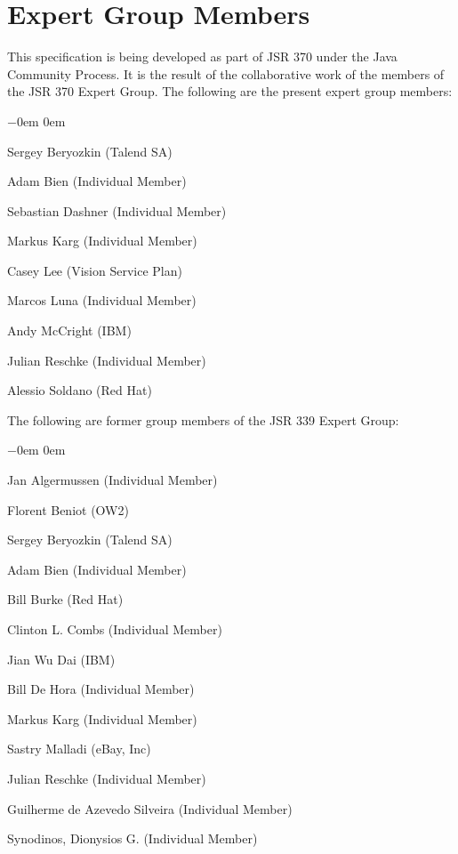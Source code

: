 \section{Expert Group Members} 
\label{expert_group}

This specification is being developed as part of JSR 370 under the Java Community Process. It is the result of the collaborative work of the members of the JSR 370 Expert Group. The following are the present expert group members:

\begin{list}{$-$}{\parsep 0em  0em}
\item Sergey Beryozkin (Talend SA) 
\item Adam Bien (Individual Member) 
\item Sebastian Dashner (Individual Member)
\item Markus Karg (Individual Member)
\item Casey Lee (Vision Service Plan)
\item Marcos Luna (Individual Member)
\item Andy McCright (IBM)
\item Julian Reschke (Individual Member)
\item Alessio Soldano (Red Hat) 
\end{list}

The following are former group members of the JSR 339 Expert Group:

\begin{list}{$-$}{\parsep 0em  0em}
\item Jan Algermussen (Individual Member)
\item Florent Beniot (OW2)
\item Sergey Beryozkin (Talend SA) 
\item Adam Bien (Individual Member)
\item Bill Burke (Red Hat)
\item Clinton L. Combs (Individual Member)
\item Jian Wu Dai (IBM)
\item Bill De Hora (Individual Member)
\item Markus Karg (Individual Member)
\item Sastry Malladi (eBay, Inc)
\item Julian Reschke (Individual Member)
\item Guilherme de Azevedo Silveira (Individual Member)
\item Synodinos, Dionysios G. (Individual Member)
\end{list}


